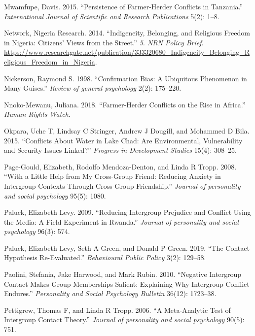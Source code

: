 \documentclass[11pt]{article}
\begin{document}
\leavevmode\hypertarget{ref-mwamfupe2015persistence}{}%
Mwamfupe, Davis. 2015. ``Persistence of Farmer-Herder Conflicts in
Tanzania.'' \emph{International Journal of Scientific and Research
Publications} 5(2): 1--8.

\leavevmode\hypertarget{ref-nigeria2014freedom}{}%
Network, Nigeria Research. 2014. ``Indigeneity, Belonging, and Religious
Freedom in Nigeria: Citizens' Views from the Street.'' \emph{5. NRN
Policy Brief}.
\url{https://www.researchgate.net/publication/333320680_Indigeneity_Belonging_Religious_Freedom_in_Nigeria}.

\leavevmode\hypertarget{ref-nickerson1998confirmation}{}%
Nickerson, Raymond S. 1998. ``Confirmation Bias: A Ubiquitous Phenomenon
in Many Guises.'' \emph{Review of general psychology} 2(2): 175--220.

\leavevmode\hypertarget{ref-hrc2018farmer}{}%
Nnoko-Mewanu, Juliana. 2018. ``Farmer-Herder Conflicts on the Rise in
Africa.'' \emph{Human Rights Watch}.

\leavevmode\hypertarget{ref-okpara2015conflicts}{}%
Okpara, Uche T, Lindsay C Stringer, Andrew J Dougill, and Mohammed D
Bila. 2015. ``Conflicts About Water in Lake Chad: Are Environmental,
Vulnerability and Security Issues Linked?'' \emph{Progress in
Development Studies} 15(4): 308--25.

\leavevmode\hypertarget{ref-page2008little}{}%
Page-Gould, Elizabeth, Rodolfo Mendoza-Denton, and Linda R Tropp. 2008.
``With a Little Help from My Cross-Group Friend: Reducing Anxiety in
Intergroup Contexts Through Cross-Group Friendship.'' \emph{Journal of
personality and social psychology} 95(5): 1080.

\leavevmode\hypertarget{ref-paluck2009jsp}{}%
Paluck, Elizabeth Levy. 2009. ``Reducing Intergroup Prejudice and
Conflict Using the Media: A Field Experiment in Rwanda.'' \emph{Journal
of personality and social psychology} 96(3): 574.

\leavevmode\hypertarget{ref-paluck2019contact}{}%
Paluck, Elizabeth Levy, Seth A Green, and Donald P Green. 2019. ``The
Contact Hypothesis Re-Evaluated.'' \emph{Behavioural Public Policy}
3(2): 129--58.

\leavevmode\hypertarget{ref-paolini2010negative}{}%
Paolini, Stefania, Jake Harwood, and Mark Rubin. 2010. ``Negative
Intergroup Contact Makes Group Memberships Salient: Explaining Why
Intergroup Conflict Endures.'' \emph{Personality and Social Psychology
Bulletin} 36(12): 1723--38.

\leavevmode\hypertarget{ref-pettigrew2006meta}{}%
Pettigrew, Thomas F, and Linda R Tropp. 2006. ``A Meta-Analytic Test of
Intergroup Contact Theory.'' \emph{Journal of personality and social
psychology} 90(5): 751.
\end{document}
